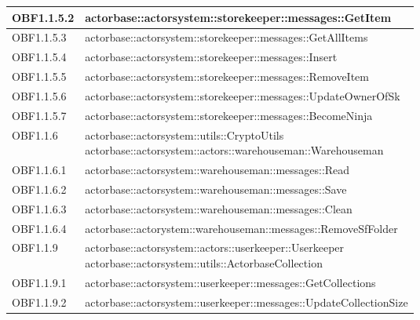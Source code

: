 \documentclass{scalatekids-article}
\begin{document}
\begin{longtable}[H]{|p{4.5cm}|p{13cm}|}
  \hline
  OBF1.1.5.2 & \multiLineCell[t]{actorbase::actorsystem::storekeeper::messages::GetItem\\}\\
  \hline
  OBF1.1.5.3 & \multiLineCell[t]{actorbase::actorsystem::storekeeper::messages::GetAllItems\\}\\
  \hline
  OBF1.1.5.4 & \multiLineCell[t]{actorbase::actorsystem::storekeeper::messages::Insert\\}\\
  \hline
  OBF1.1.5.5 & \multiLineCell[t]{actorbase::actorsystem::storekeeper::messages::RemoveItem\\}\\
  \hline
  OBF1.1.5.6 & \multiLineCell[t]{actorbase::actorsystem::storekeeper::messages::UpdateOwnerOfSk\\}\\
  \hline
  OBF1.1.5.7 & \multiLineCell[t]{actorbase::actorsystem::storekeeper::messages::BecomeNinja\\}\\
  \hline
  OBF1.1.6 & \multiLineCell[t]{actorbase::actorsystem::utils::CryptoUtils\\actorbase::actorsystem::actors::warehouseman::Warehouseman\\}\\
  \hline
  OBF1.1.6.1 & \multiLineCell[t]{actorbase::actorsystem::warehouseman::messages::Read\\}\\
  \hline
  OBF1.1.6.2 & \multiLineCell[t]{actorbase::actorsystem::warehouseman::messages::Save\\}\\
  \hline
  OBF1.1.6.3 & \multiLineCell[t]{actorbase::actorsystem::warehouseman::messages::Clean\\}\\
  \hline
  OBF1.1.6.4 & \multiLineCell[t]{actorbase::actorystem::warehouseman::messages::RemoveSfFolder\\}\\
  \hline
  OBF1.1.9 & \multiLineCell[t]{actorbase::actorsystem::actors::userkeeper::Userkeeper\\actorbase::actorsystem::utils::ActorbaseCollection\\}\\
  \hline
  OBF1.1.9.1 & \multiLineCell[t]{actorbase::actorsystem::userkeeper::messages::GetCollections\\}\\
  \hline
  OBF1.1.9.2 & \multiLineCell[t]{actorbase::actorsystem::userkeeper::messages::UpdateCollectionSize\\}\\

\end{longtable}
\end{document}
